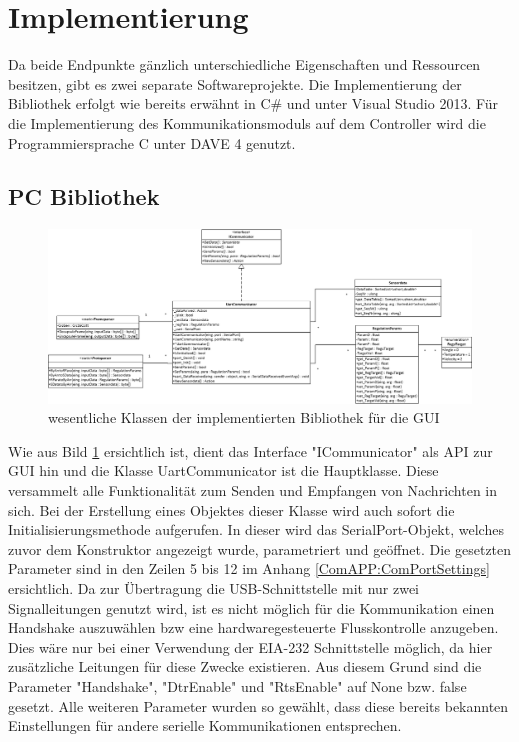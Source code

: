 \section{Implementierung}
Da beide Endpunkte gänzlich unterschiedliche Eigenschaften und Ressourcen besitzen, gibt es zwei separate Softwareprojekte. Die Implementierung der Bibliothek erfolgt wie bereits erwähnt in C\# und unter Visual Studio 2013. Für die Implementierung des Kommunikationsmoduls auf dem Controller wird die Programmiersprache C unter DAVE 4 genutzt. 
\subsection{PC Bibliothek}
\begin{figure}
  \includegraphics[width=\textwidth]{LibraryClasses}
  \caption{wesentliche Klassen der implementierten Bibliothek für die GUI}
  \label{fig:guiclasses}
\end{figure}
Wie aus Bild \ref{fig:guiclasses} ersichtlich ist, dient das Interface "ICommunicator" als API zur GUI hin und die Klasse UartCommunicator ist die Hauptklasse. Diese versammelt alle Funktionalität zum Senden und Empfangen von Nachrichten in sich. Bei der Erstellung eines Objektes dieser Klasse wird auch sofort die Initialisierungsmethode aufgerufen. In dieser wird das SerialPort-Objekt, welches zuvor dem Konstruktor angezeigt wurde, parametriert und geöffnet. Die gesetzten Parameter sind in den Zeilen 5 bis 12 im Anhang \ref{ComAPP:ComPortSettings} ersichtlich. Da zur Übertragung die USB-Schnittstelle mit nur zwei Signalleitungen genutzt wird, ist es nicht möglich für die Kommunikation einen Handshake auszuwählen bzw eine hardwaregesteuerte Flusskontrolle anzugeben. Dies wäre nur bei einer Verwendung der EIA-232 Schnittstelle möglich, da hier zusätzliche Leitungen für diese Zwecke existieren. Aus diesem Grund sind die Parameter "Handshake", "DtrEnable" und "RtsEnable" auf None bzw. false gesetzt. Alle weiteren Parameter wurden so gewählt, dass diese bereits bekannten Einstellungen für andere serielle Kommunikationen entsprechen.
